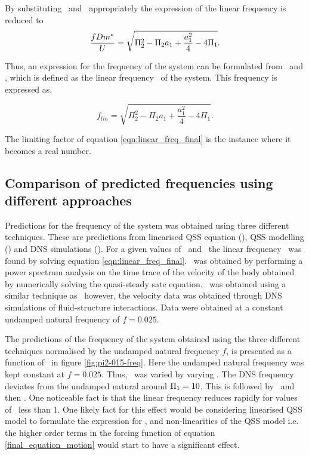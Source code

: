 By substituting \massstiff\ and \massdamp\ appropriately the expression of the linear frequency is reduced to   
\begin{equation}
\label{eqn:linear_freq_final-1}
\frac{fDm^{*}}{U} = \sqrt{\Pi_2^2 - \Pi_2a_1 + \frac{a_1^2}{4} - 4\Pi_1}.
\end{equation}

Thus, an expression for the frequency of the system can be formulated from \massstiff\ and \massdamp, which is defined as the linear frequency  \freqlin\ of the system. This frequency is expressed as,

\begin{equation}
\label{eqn:linear_freq_final}
f_{lin} = \sqrt{\Pi_2^2 - \Pi_2a_1 + \frac{a_1^2}{4} - 4\Pi_1}.
\end{equation}
 
The limiting factor of equation \ref{eqn:linear_freq_final} is the instance where it becomes a real number.

\subsection{Comparison of predicted frequencies using different approaches}

Predictions for the frequency of the system was obtained using three different techniques. These are  predictions from linearised QSS equation (\freqlin), QSS modelling (\freqqss) and DNS simulations (\freqdns). For a given values of \massstiff\ and \massdamp\, the linear frequency \freqlin\ was found by solving equation \ref{eqn:linear_freq_final}. \freqqss\ was obtained by performing a power spectrum analysis on the time trace of the velocity of the body  obtained by numerically solving the quasi-steady sate equation. \freqdns\ was obtained using a similar technique as \freqqss\ however, the velocity data was obtained through DNS simulations of fluid-structure interactions. Data were obtained at a constant undamped natural frequency of $f=0.025$.




The predictions of the frequency of the system obtained using the three different techniques normalised by the  undamped natural frequency $f$, is presented as a function of \massstiff\ in figure \ref{fig:pi2-015-freq}. Here the undamped natural frequency was kept constant at $f=0.025$. Thus, \massstiff\ was varied by varying \mstar. The DNS frequency deviates from the undamped natural around $\Pi_1=10$. This is followed by \freqlin\ and then \freqqss. One noticeable fact is that the linear frequency reduces rapidly for values of \massstiff\ less than 1. One likely fact for this effect would be considering linearised QSS model to formulate the expression for \freqlin, and non-linearities of the QSS model i.e. the higher order terms in the forcing function of equation \ref{final_equation_motion} would start to have a significant effect. 


